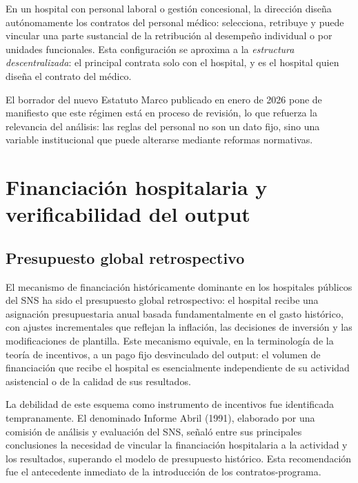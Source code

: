 En un hospital con personal laboral o gestión concesional, la dirección diseña autónomamente los contratos del personal médico: selecciona, retribuye y puede vincular una parte sustancial de la retribución al desempeño individual o por unidades funcionales. Esta configuración se aproxima a la \textit{estructura descentralizada}: el principal contrata solo con el hospital, y es el hospital quien diseña el contrato del médico.

El borrador del nuevo Estatuto Marco publicado en enero de 2026 \citep{ministerio2026estatuto} pone de manifiesto que este régimen está en proceso de revisión, lo que refuerza la relevancia del análisis: las reglas del personal no son un dato fijo, sino una variable institucional que puede alterarse mediante reformas normativas.



\section{Financiación hospitalaria y verificabilidad del output}
\label{sec:financiacion}

\subsection{Presupuesto global retrospectivo}

El mecanismo de financiación históricamente dominante en los hospitales públicos del SNS ha sido el presupuesto global retrospectivo: el hospital recibe una asignación presupuestaria anual basada fundamentalmente en el gasto histórico, con ajustes incrementales que reflejan la inflación, las decisiones de inversión y las modificaciones de plantilla. Este mecanismo equivale, en la terminología de la teoría de incentivos, a un pago fijo desvinculado del output: el volumen de financiación que recibe el hospital es esencialmente independiente de su actividad asistencial o de la calidad de sus resultados.

La debilidad de este esquema como instrumento de incentivos fue identificada tempranamente. El denominado Informe Abril (1991), elaborado por una comisión de análisis y evaluación del SNS, señaló entre sus principales conclusiones la necesidad de vincular la financiación hospitalaria a la actividad y los resultados, superando el modelo de presupuesto histórico. Esta recomendación fue el antecedente inmediato de la introducción de los contratos-programa.

